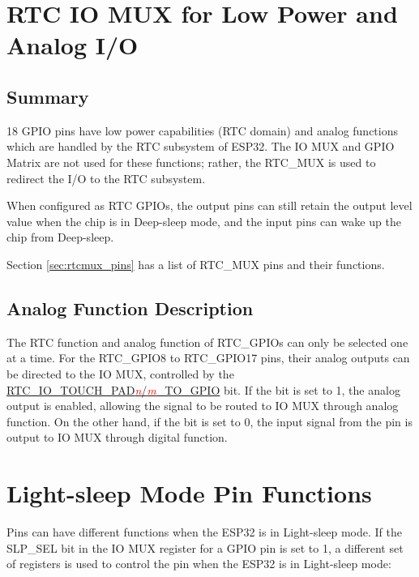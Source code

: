 \documentclass[main\_\_EN.tex]{subfiles}
\begin{document}
\section{RTC IO MUX for Low Power and Analog I/O}

\subsection{Summary}

18 GPIO pins have low power capabilities (RTC domain) and analog functions which are handled by the RTC subsystem of ESP32. The IO MUX and GPIO Matrix are not used for these functions; rather, the RTC\_MUX is used to redirect the I/O to the RTC subsystem.

When configured as RTC GPIOs, the output pins can still retain the output level value when the chip is in Deep-sleep mode, and the input pins can wake up the chip from Deep-sleep.

Section \ref{sec:rtcmux_pins} has a list of RTC\_MUX pins and their functions.

\subsection{Analog Function Description}\label{sec:rtc_gpio_analog_func}

The RTC function and analog function of RTC\_GPIOs can only be selected one at a time. For the RTC\_GPIO8 to RTC\_GPIO17 pins, their analog outputs can be directed to the IO MUX, controlled by the \hyperref[regdesc:RTCIOTOUCHPADnREG]{RTC\_IO\_TOUCH\_PAD\textcolor{red}{\it{n}}/\textcolor{red}{\it{m}}\_TO\_GPIO} bit. If the bit is set to 1, the analog output is enabled, allowing the signal to be routed to IO MUX through analog function. On the other hand, if the bit is set to 0, the input signal from the pin is output to IO MUX through digital function.

\section{Light-sleep Mode Pin Functions}

Pins can have different functions when the ESP32 is in Light-sleep mode. If the SLP\_SEL bit in the IO MUX register for a GPIO pin is set to 1, a different set of registers is used to control the pin when the ESP32 is in Light-sleep mode:



\end{document}
